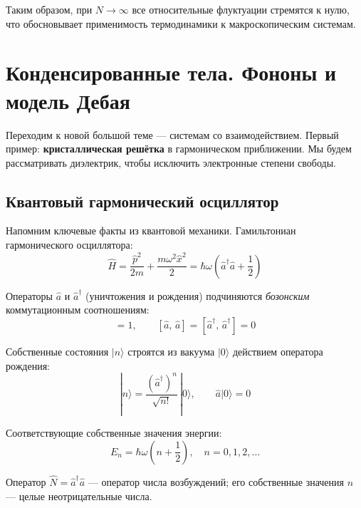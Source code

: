 \documentclass[../general/general]{subfiles}
\begin{document}
Таким образом, при $N \to \infty$ все относительные флуктуации стремятся к нулю, что обосновывает применимость термодинамики к макроскопическим системам.



\section{Конденсированные тела. Фононы и модель Дебая}

Переходим к новой большой теме --- системам со взаимодействием. Первый пример: \textbf{кристаллическая решётка} в гармоническом приближении. Мы будем рассматривать диэлектрик, чтобы исключить электронные степени свободы.

\subsection{Квантовый гармонический осциллятор}

Напомним ключевые факты из квантовой механики. Гамильтониан гармонического осциллятора:
\begin{equation}
    \hat{H} = \frac{\hat{p}^2}{2m} + \frac{m\omega^2\hat{x}^2}{2} = \hbar\omega\!\left(\hat{a}^\dagger\hat{a} + \frac{1}{2}\right)
\end{equation}

Операторы $\hat{a}$ и $\hat{a}^\dagger$ (уничтожения и рождения) подчиняются \emph{бозонским} коммутационным соотношениям:
\begin{equation}
    [\hat{a},\,\hat{a}^\dagger] = 1, \qquad [\hat{a},\,\hat{a}] = [\hat{a}^\dagger,\,\hat{a}^\dagger] = 0
\end{equation}

Собственные состояния $|n\rangle$ строятся из вакуума $|0\rangle$ действием оператора рождения:
\begin{equation}
    |n\rangle = \frac{(\hat{a}^\dagger)^n}{\sqrt{n!}}\,|0\rangle, \qquad \hat{a}|0\rangle = 0
\end{equation}

Соответствующие собственные значения энергии:
\begin{equation}
    E_n = \hbar\omega\!\left(n + \frac{1}{2}\right), \quad n = 0,1,2,\ldots
\end{equation}

Оператор $\hat{N} = \hat{a}^\dagger\hat{a}$ --- оператор числа возбуждений; его собственные значения $n$ --- целые неотрицательные числа.
\end{document}

